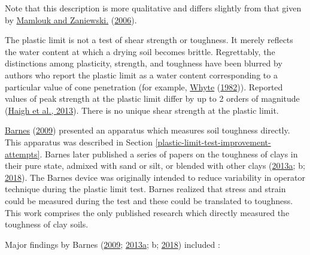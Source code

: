 \documentclass[
  letterpaper,
  openany]{book}
\begin{document}
Note that this description is more qualitative and differs slightly from that given by \protect\hyperlink{ref-Mamlouk2006}{Mamlouk and Zaniewski.} (\protect\hyperlink{ref-Mamlouk2006}{2006}).

The plastic limit is not a test of shear strength or toughness. It merely reflects the water content at which a drying soil becomes brittle.
Regrettably, the distinctions among plasticity, strength, and toughness have been blurred by authors who report the plastic limit as a water content corresponding to a particular value of cone penetration (for example, \protect\hyperlink{ref-Whyte1982}{Whyte} (\protect\hyperlink{ref-Whyte1982}{1982})).
Reported values of peak strength at the plastic limit differ by up to 2 orders of magnitude (\protect\hyperlink{ref-Haigh2013}{Haigh et al., 2013}).
There is no unique shear strength at the plastic limit.

\protect\hyperlink{ref-Barnes2009}{Barnes} (\protect\hyperlink{ref-Barnes2009}{2009}) presented an apparatus which measures soil toughness directly.
This apparatus was described in Section \ref{plastic-limit-test-improvement-attempts}.
Barnes later published a series of papers on the toughness of clays in their pure state, admixed with sand or silt, or blended with other clays (\protect\hyperlink{ref-Barnes2013}{2013a}; b; \protect\hyperlink{ref-Barnes2018}{2018}).
The Barnes device was originally intended to reduce variability in operator technique during the plastic limit test.
Barnes realized that stress and strain could be measured during the test and these could be translated to toughness.
This work comprises the only published research which directly measured the toughness of clay soils.

Major findings by Barnes (\protect\hyperlink{ref-Barnes2009}{2009}; \protect\hyperlink{ref-Barnes2013}{2013a}; b; \protect\hyperlink{ref-Barnes2018}{2018}) included :
\end{document}
